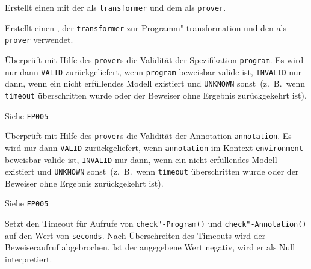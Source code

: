 
\begin{description}%

    Erstellt einen  mit der
     als \texttt{transformer}
    und dem  als \texttt{prover}.%


    Erstellt einen , der
    \texttt{transformer} zur Programm"-transformation und den
     als \texttt{prover} verwendet.%


    Überprüft mit Hilfe des \texttt{prover}s die Validität der Spezifikation
    \texttt{program}. Es wird nur dann \texttt{VALID} zurückgeliefert,
    wenn \texttt{program} beweisbar valide ist, \texttt{INVALID} nur
    dann, wenn ein nicht erfüllendes Modell existiert und
    \texttt{UNKNOWN} sonst~(z.~B.\, wenn \texttt{timeout}
    überschritten wurde oder der Beweiser ohne Ergebnis zurückgekehrt
    ist).%


    Siehe \texttt{FP005}%


    Überprüft mit Hilfe des \texttt{prover}s die Validität der Annotation
    \texttt{annotation}. Es wird nur dann \texttt{VALID}
    zurückgeliefert, wenn \texttt{annotation} im Kontext
    \texttt{environment} beweisbar valide ist, \texttt{INVALID} nur
    dann, wenn ein nicht erfüllendes Modell existiert und
    \texttt{UNKNOWN} sonst~(z.~B.\, wenn \texttt{timeout}
    überschritten wurde oder der Beweiser ohne Ergebnis zurückgekehrt
    ist).%


    Siehe \texttt{FP005}%



    Setzt den Timeout für Aufrufe von \texttt{check"-Program()} und
    \texttt{check"-Annotation()} auf den Wert von \texttt{seconds}.
    Nach Überschreiten des Timeouts wird der Beweiseraufruf
    abgebrochen. Ist der angegebene Wert negativ, wird er als Null
    interpretiert.%

\end{description}%

